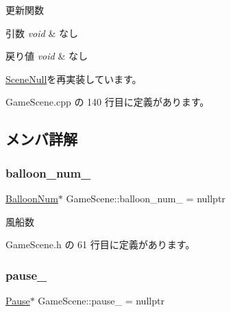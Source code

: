 更新関数 


\begin{DoxyParams}{引数}
{\em void} & なし \\
\hline
\end{DoxyParams}

\begin{DoxyRetVals}{戻り値}
{\em void} & なし \\
\hline
\end{DoxyRetVals}


\mbox{\hyperlink{class_scene_null_a79de810b699f496fda20e4ac837d075a}{Scene\+Null}}を再実装しています。



 Game\+Scene.\+cpp の 140 行目に定義があります。



\subsection{メンバ詳解}
\mbox{\label{class_game_scene_a721bf927c3a3953fbe6333aea1718c3b}} 
\subsubsection{\texorpdfstring{balloon\+\_\+num\+\_\+}{balloon\_num\_}}
{\footnotesize\ttfamily \mbox{\hyperlink{class_balloon_num}{Balloon\+Num}}$\ast$ Game\+Scene\+::balloon\+\_\+num\+\_\+ = nullptr\hspace{0.3cm}{\ttfamily [private]}}



風船数 



 Game\+Scene.\+h の 61 行目に定義があります。

\mbox{\label{class_game_scene_a998ade349a8d24fbeaea63d3455c6954}} 
\subsubsection{\texorpdfstring{pause\+\_\+}{pause\_}}
{\footnotesize\ttfamily \mbox{\hyperlink{class_pause}{Pause}}$\ast$ Game\+Scene\+::pause\+\_\+ = nullptr\hspace{0.3cm}{\ttfamily [private]}}




